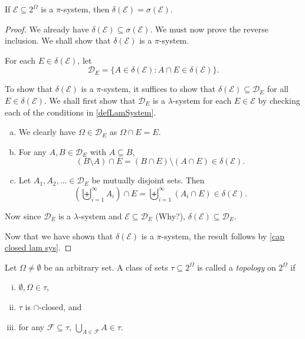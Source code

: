 \begin{theorem}
\label{dynkins pi lam theorem}
    If $\mathcal{E}\subseteq2^\Omega$ is a $\pi$-system, then $\delta(\mathcal{E})=\sigma(\mathcal{E})$.
\end{theorem}
\begin{proof}
    We already have $\delta(\mathcal{E})\subseteq\sigma(\mathcal{E})$. We must now prove the reverse inclusion. We shall show that $\delta(\mathcal{E})$ is a $\pi$-system.
    
    For each $E\in\delta(\mathcal{E})$, let
    $$\mathcal{D}_E=\{A\in\delta(\mathcal{E}) : A\cap E\in\delta(\mathcal{E})\}.$$
    
    To show that $\delta(\mathcal{E})$ is a $\pi$-system, it suffices to show that $\delta(\mathcal{E})\subseteq\mathcal{D}_E$ for all $E\in\delta(\mathcal{E})$. We shall first show that $\mathcal{D}_E$ is a $\lambda$-system for each $E\in\mathcal{E}$ by checking each of the conditions in \ref{defLamSystem}.
    \begin{enumerate}[(a)]
        \item We clearly have $\Omega\in\mathcal{D}_E$ as $\Omega\cap E=E$.
        \item For any $A,B\in\mathcal{D}_E$ with $A\subseteq B$, 
        $$(B\setminus A)\cap E = (B\cap E)\setminus(A\cap E)\in\delta(\mathcal{E}).$$
        \item Let $A_1,A_2,\ldots\in\mathcal{D}_E$ be mutually disjoint sets. Then
        $$\left(\biguplus_{i=1}^\infty A_i\right)\cap E = \biguplus_{i=1}^\infty\left(A_i\cap E\right)\in\delta(\mathcal{E}).$$
    \end{enumerate}
    Now since $\mathcal{D}_E$ is a $\lambda$-system and $\mathcal{E}\subseteq\mathcal{D}_E$ (Why?), $\delta(\mathcal{E})\subseteq\mathcal{D}_E$.
    
    Now that we have shown that $\delta(\mathcal{E})$ is a $\pi$-system, the result follows by \ref{cap closed lam sys}.
\end{proof}

\begin{definition}[Topology]
    Let $\Omega\neq\emptyset$ be an arbitrary set. A class of sets $\tau\subseteq2^\Omega$ is called a \textit{topology} on $2^\Omega$ if
    \begin{enumerate}[(i)]
        \item $\emptyset,\Omega\in\tau$,
        \item $\tau$ is $\cap$-closed, and
        \item for any $\mathcal{F}\subseteq\tau$, $\bigcup_{A\in\mathcal{F}}A\in\tau.$
    \end{enumerate}
\end{definition}

